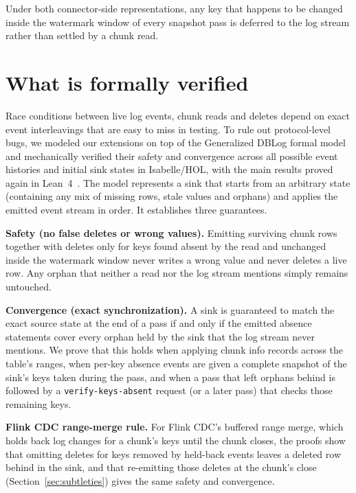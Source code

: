 \documentclass[sigconf,nonacm,10pt]{acmart}
\begin{document}
Under both connector-side representations, any key that happens to be changed
inside the watermark window of every snapshot pass is deferred to the log stream
rather than settled by a chunk read.

\section{What is formally verified}\label{sec:checked}

Race conditions between live log events, chunk reads and deletes depend on
exact event interleavings that are easy to miss in testing. To rule out
protocol-level bugs, we modeled our extensions on top of the Generalized DBLog
formal model~\cite{andreakis2026generalized,generalized_dblog_artifact} and
mechanically verified their safety and convergence across all possible event
histories and initial sink states in Isabelle/HOL, with the main results proved
again in Lean~4~\cite{orphan_absence_artifact}. The model represents a sink
that starts from an arbitrary state (containing any mix of missing rows, stale
values and orphans) and applies the emitted event stream in order. It
establishes three guarantees.

\textbf{Safety (no false deletes or wrong values).} Emitting surviving chunk
rows together with deletes only for keys found absent by the read and unchanged
inside the watermark window never writes a wrong value and never deletes a
live row. Any orphan that neither a read nor the log stream mentions simply
remains untouched.

\textbf{Convergence (exact synchronization).} A sink is guaranteed to match the
exact source state at the end of a pass if and only if the emitted absence
statements cover every orphan held by the sink that the log stream never
mentions. We prove that this holds when applying chunk info records across the
table's ranges, when per-key absence events are given a complete snapshot of
the sink's keys taken during the pass, and when a pass that left orphans behind is followed by a
\texttt{verify-keys-absent} request (or a later pass) that checks those
remaining keys.

\textbf{Flink CDC range-merge rule.} For Flink CDC's buffered range merge, which
holds back log changes for a chunk's keys until the chunk closes, the proofs
show that omitting deletes for keys removed by held-back events leaves a
deleted row behind in the sink, and that re-emitting those deletes at the
chunk's close (Section~\ref{sec:subtleties}) gives the same safety and
convergence.
\end{document}
